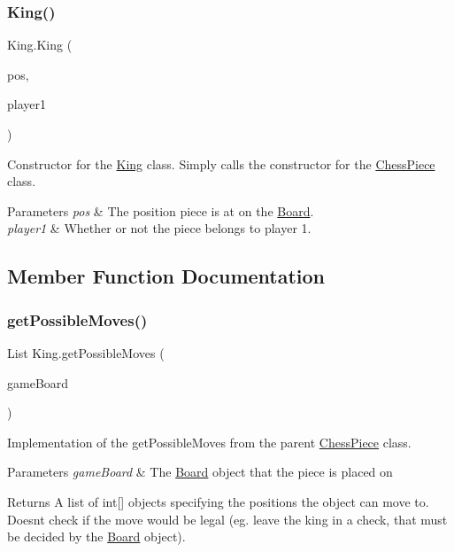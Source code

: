 \subsubsection{\texorpdfstring{King()}{King()}}
{\footnotesize\ttfamily King.\+King (\begin{DoxyParamCaption}\item[{@Not\+Null int \mbox{[}$\,$\mbox{]}}]{pos,  }\item[{boolean}]{player1 }\end{DoxyParamCaption})}

Constructor for the \mbox{\hyperlink{class_king}{King}} class. Simply calls the constructor for the \mbox{\hyperlink{class_chess_piece}{Chess\+Piece}} class. 
\begin{DoxyParams}{Parameters}
{\em pos} & The position piece is at on the \mbox{\hyperlink{class_board}{Board}}. \\
\hline
{\em player1} & Whether or not the piece belongs to player 1. \\
\hline
\end{DoxyParams}


\subsection{Member Function Documentation}
\mbox{\label{class_king_ac6fc988cceee3c181c0a341c76b7487e}} 
\subsubsection{\texorpdfstring{get\+Possible\+Moves()}{getPossibleMoves()}}
{\footnotesize\ttfamily List King.\+get\+Possible\+Moves (\begin{DoxyParamCaption}\item[{@Not\+Null \mbox{\hyperlink{class_board}{Board}}}]{game\+Board }\end{DoxyParamCaption})}

Implementation of the get\+Possible\+Moves from the parent \mbox{\hyperlink{class_chess_piece}{Chess\+Piece}} class. 
\begin{DoxyParams}{Parameters}
{\em game\+Board} & The \mbox{\hyperlink{class_board}{Board}} object that the piece is placed on \\
\hline
\end{DoxyParams}
\begin{DoxyReturn}{Returns}
A list of int\mbox{[}\mbox{]} objects specifying the positions the object can move to. Doesn\textquotesingle{}t check if the move would be legal (eg. leave the king in a check, that must be decided by the \mbox{\hyperlink{class_board}{Board}} object). 
\end{DoxyReturn}
\mbox{\label{class_king_a68975ad02af5e0f0e1bdf19a67b14076}} 

